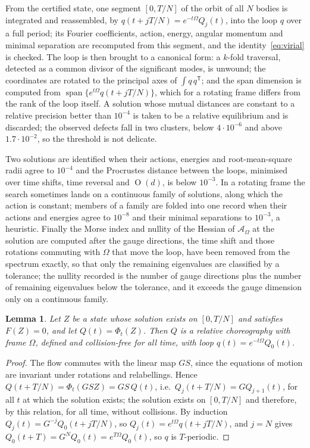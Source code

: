 \documentclass[11pt]{amsart}
\newtheorem{lemma}[theorem]{Lemma}
\theoremstyle{definition}
\newcommand{\act}{\mathcal{A}}
\DeclareMathOperator{\spn}{span}
\DeclareMathOperator{\Orth}{O}
\begin{document}
From the certified state, one segment $[0,T/N]$ of the orbit of all $N$ bodies is integrated and reassembled, by $q(t+jT/N)=e^{-t\Omega}Q_j(t)$, into the loop $q$ over a full period; its Fourier coefficients, action, energy, angular momentum and minimal separation are recomputed from this segment, and the identity~\eqref{eq:virial} is checked. The loop is then brought to a canonical form: a $k$-fold traversal, detected as a common divisor of the significant modes, is unwound; the coordinates are rotated to the principal axes of $\int q\,q^{\mathsf T}$; and the span dimension is computed from $\spn\{e^{t\Omega}q(t+jT/N)\}$, which for a rotating frame differs from the rank of the loop itself. A solution whose mutual distances are constant to a relative precision better than $10^{-4}$ is taken to be a relative equilibrium and is discarded; the observed defects fall in two clusters, below $4\cdot10^{-6}$ and above $1.7\cdot10^{-2}$, so the threshold is not delicate.

Two solutions are identified when their actions, energies and root-mean-square radii agree to $10^{-4}$ and the Procrustes distance between the loops, minimised over time shifts, time reversal and $\Orth(d)$, is below $10^{-3}$. In a rotating frame the search sometimes lands on a continuous family of solutions, along which the action is constant; members of a family are folded into one record when their actions and energies agree to $10^{-8}$ and their minimal separations to $10^{-3}$, a heuristic. Finally the Morse index and nullity of the Hessian of $\act_\Omega$ at the solution are computed after the gauge directions, the time shift and those rotations commuting with $\Omega$ that move the loop, have been removed from the spectrum exactly, so that only the remaining eigenvalues are classified by a tolerance; the nullity recorded is the number of gauge directions plus the number of remaining eigenvalues below the tolerance, and it exceeds the gauge dimension only on a continuous family.

\begin{lemma}\label{lem:shooting}
Let $Z$ be a state whose solution exists on $[0,T/N]$ and satisfies $F(Z)=0$, and let $Q(t)=\Phi_t(Z)$. Then $Q$ is a relative choreography with frame $\Omega$, defined and collision-free for all time, with loop $q(t)=e^{-t\Omega}Q_0(t)$.
\end{lemma}

\begin{proof}
The flow commutes with the linear map $GS$, since the equations of motion are invariant under rotations and relabellings. Hence $Q(t+T/N)=\Phi_t(GSZ)=GS\,Q(t)$, i.e.\ $Q_j(t+T/N)=GQ_{j+1}(t)$, for all $t$ at which the solution exists; the solution exists on $[0,T/N]$ and therefore, by this relation, for all time, without collisions. By induction $Q_j(t)=G^{-j}Q_0(t+jT/N)$, so $Q_j(t)=e^{t\Omega}q(t+jT/N)$, and $j=N$ gives $Q_0(t+T)=G^NQ_0(t)=e^{T\Omega}Q_0(t)$, so $q$ is $T$-periodic.
\end{proof}
\end{document}
